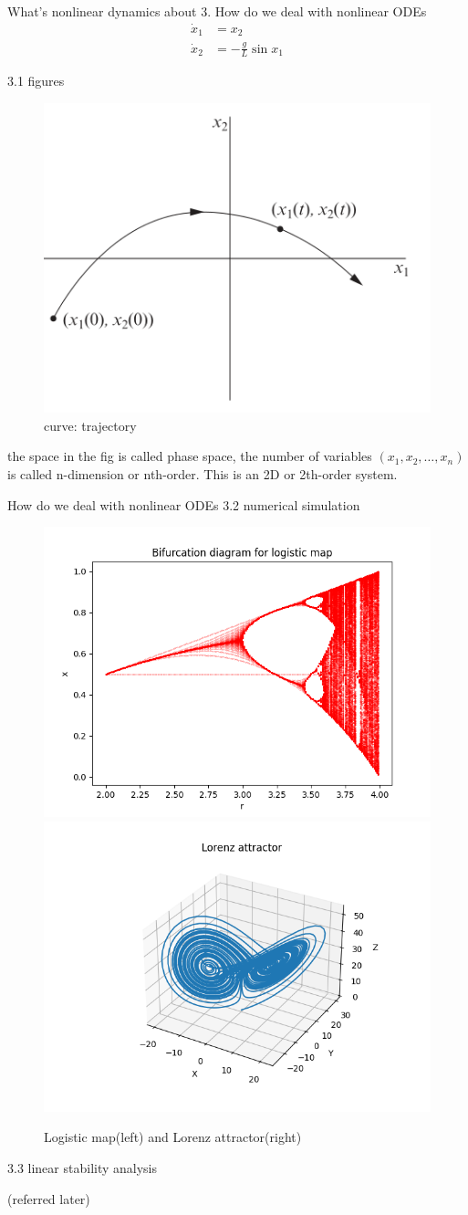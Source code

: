 \documentclass[9pt,aspectratio=43,mathserif,table]{beamer}
\begin{document}
\begin{frame}{What's nonlinear dynamics about}
   3. How do we deal with nonlinear ODEs
    \begin{equation}
      \begin{aligned}
        \dot x_1 &= x_2 \\
        \dot x_2 &= - \frac{ g}{L} \sin x_1
      \end{aligned}
    \end{equation}

    3.1 figures 
    \begin{figure}[!h]
      \centering
      \includegraphics[width=.3\textwidth]{fig/trajectory.png}
      \caption{curve: trajectory}
    \end{figure}

    the space in the fig is called phase space, the number of variables $(x_1,x_2,\ldots,x_n)$ is called n-dimension or nth-order. This is an 2D or 2th-order system.

\end{frame}

\begin{frame}{How do we deal with nonlinear ODEs}
   3.2 numerical simulation

    \begin{figure}[!h]
      \centering
      \includegraphics[width=.4\textwidth]{fig/logisticMap.png}
      \includegraphics[width=.4\textwidth]{fig/Lorenz attractor.png}
      \caption{Logistic map(left) and Lorenz attractor(right)}
    \end{figure}


   3.3 linear stability analysis

   (referred later)

\end{frame}
\end{document}
